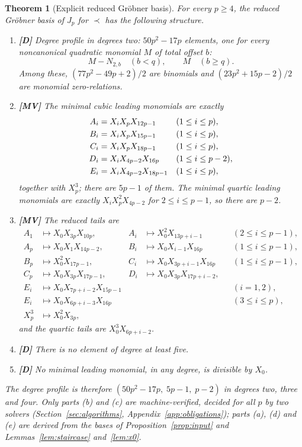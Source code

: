 \documentclass[11pt]{article}
\newtheorem{theorem}{Theorem}[section]
\theoremstyle{definition}
\theoremstyle{remark}
\newcommand{\mD}{\textbf{[D]}}
\newcommand{\mMV}{\textbf{[MV]}}
\begin{document}
\begin{theorem}[Explicit reduced Gr\"obner basis]\label{thm:groebner}
For every $p\geq4$, the reduced Gr\"obner basis of $J_p$ for $\prec$ has the following
structure.
\begin{enumerate}
\item[\textup{(a)}] \mD{} Degree profile in degrees two: $50p^2-17p$ elements, one for every
noncanonical quadratic monomial $M$ of total offset $b$:
\[
 M-N_{2,b}\quad(b<q),\qquad M\quad(b\geq q).
\]
Among these, $(77p^2-49p+2)/2$ are binomials and $(23p^2+15p-2)/2$ are monomial
zero-relations.
\item[\textup{(b)}] \mMV{} The minimal cubic leading monomials are exactly
\begin{align}
A_i&=X_iX_pX_{12p-1} &&(1\leq i\leq p),\notag\\
B_i&=X_iX_pX_{15p-1} &&(1\leq i\leq p),\notag\\
C_i&=X_iX_pX_{18p-1} &&(1\leq i\leq p),\notag\\
D_i&=X_iX_{4p-2}X_{16p} &&(1\leq i\leq p-2),\notag\\
E_i&=X_iX_{4p-2}X_{18p-1} &&(1\leq i\leq p),\label{eq:cubics}
\end{align}
together with $X_p^3$; there are $5p-1$ of them. The minimal quartic leading monomials are exactly
$X_iX_p^2X_{4p-2}$ for $2\leq i\leq p-1$, so there are $p-2$.
\item[\textup{(c)}] \mMV{} The reduced tails are
\begin{equation}\label{eq:tails}
\begin{aligned}
A_1&\longmapsto X_0X_{3p}X_{10p},&
A_i&\longmapsto X_0^2X_{13p+i-1} &&(2\leq i\leq p-1),\\
A_p&\longmapsto X_0X_1X_{14p-2},&
B_i&\longmapsto X_0X_{i-1}X_{16p} &&(1\leq i\leq p-1),\\
B_p&\longmapsto X_0^2X_{17p-1},&
C_i&\longmapsto X_0X_{3p+i-1}X_{16p} &&(1\leq i\leq p-1),\\
C_p&\longmapsto X_0X_{3p}X_{17p-1},&
D_i&\longmapsto X_0X_{3p}X_{17p+i-2},\\
E_i&\longmapsto X_0X_{7p+i-2}X_{15p-1} &&&&(i=1,2),\\
E_i&\longmapsto X_0X_{6p+i-3}X_{16p} &&&&(3\leq i\leq p),\\
X_p^3&\longmapsto X_0^2X_{3p},&&
\end{aligned}
\end{equation}
and the quartic tails are $X_0^3X_{6p+i-2}$.
\item[\textup{(d)}] \mD{} There is no element of degree at least five.
\item[\textup{(e)}] \mD{} No minimal leading monomial, in any degree, is divisible by $X_0$.
\end{enumerate}
The degree profile is therefore $(50p^2-17p,\;5p-1,\;p-2)$ in degrees two, three and four.
Only parts (b) and (c) are machine-verified, decided for all $p$ by two solvers
(Section~\ref{sec:algorithms}, Appendix~\ref{app:obligations}); parts (a), (d) and (e) are
derived from the bases of Proposition~\ref{prop:input} and Lemmas~\ref{lem:staircase}
and~\ref{lem:x0}.
\end{theorem}
\end{document}
